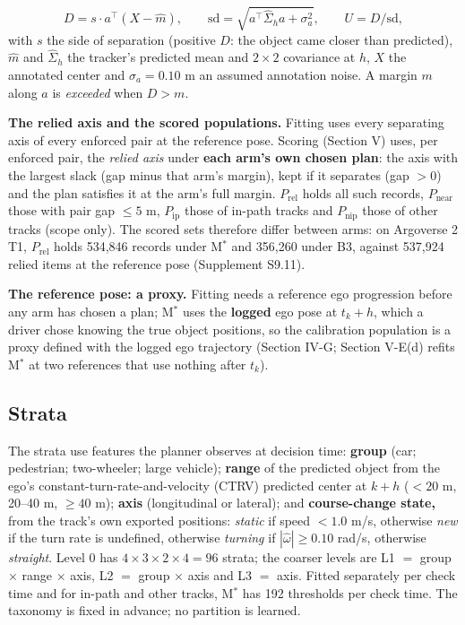 \documentclass{ieeeaccess}
\begin{document}
\begin{equation*}
D = s\cdot a^{\top}(X - \hat{m}), \qquad \mathrm{sd} = \sqrt{a^{\top}\hat{\Sigma}_h a + \sigma_a^2}, \qquad U = D/\mathrm{sd},
\end{equation*}
with $s$ the side of separation (positive $D$: the object came closer than predicted), $\hat{m}$ and $\hat{\Sigma}_{h}$ the tracker's predicted mean and $2 \times 2$ covariance at $h$, $X$ the annotated center and $\sigma_{a} = 0.10$ m an assumed annotation noise. A margin $m$ along $a$ is \emph{exceeded} when $D > m$.

\textbf{The relied axis and the scored populations.} Fitting uses every separating axis of every enforced pair at the reference pose. Scoring (Section V) uses, per enforced pair, the \emph{relied axis} under \textbf{each arm's own chosen plan}: the axis with the largest slack (gap minus that arm's margin), kept if it separates (gap $> 0$) and the plan satisfies it at the arm's full margin. $P_{\mathrm{rel}}$ holds all such records, $P_{\mathrm{near}}$ those with pair gap $\leq 5$ m, $P_{\mathrm{ip}}$ those of in-path tracks and $P_{\mathrm{nip}}$ those of other tracks (scope only). The scored sets therefore differ between arms: on Argoverse 2 T1, $P_{\mathrm{rel}}$ holds 534,846 records under M$^{*}$ and 356,260 under B3, against 537,924 relied items at the reference pose (Supplement S9.11).

\textbf{The reference pose: a proxy.} Fitting needs a reference ego progression before any arm has chosen a plan; M$^{*}$ uses the \textbf{logged} ego pose at $t_{k} + h$, which a driver chose knowing the true object positions, so the calibration population is a proxy defined with the logged ego trajectory (Section IV-G; Section V-E(d) refits M$^{*}$ at two references that use nothing after $t_{k}$).

\subsection{Strata}
The strata use features the planner observes at decision time: \textbf{group} (car; pedestrian; two-wheeler; large vehicle); \textbf{range} of the predicted object from the ego's constant-turn-rate-and-velocity (CTRV) predicted center at $k + h$ ($< 20$ m, 20--40 m, $\geq 40$ m); \textbf{axis} (longitudinal or lateral); and \textbf{course-change state,} from the track's own exported positions: \emph{static} if speed $< 1.0$ m/s, otherwise \emph{new} if the turn rate is undefined, otherwise \emph{turning} if $|\hat{\omega}| \geq 0.10$ rad/s, otherwise \emph{straight}. Level 0 has $4 \times 3 \times 2 \times 4 = 96$ strata; the coarser levels are L1 $=$ group $\times$ range $\times$ axis, L2 $=$ group $\times$ axis and L3 $=$ axis. Fitted separately per check time and for in-path and other tracks, M$^{*}$ has 192 thresholds per check time. The taxonomy is fixed in advance; no partition is learned.
\end{document}
